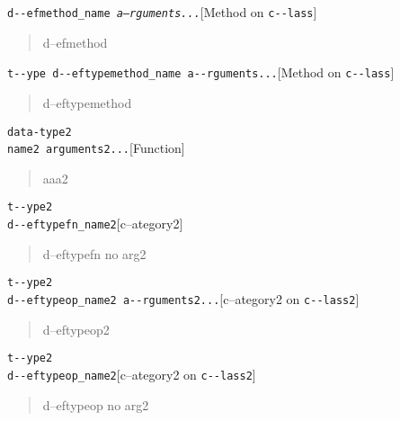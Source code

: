 \documentclass{book}
\begin{document}
\noindent\texttt{d{-}{-}efmethod\_name \EmbracOn{}\textnormal{\textsl{a--rguments...}}\EmbracOff{}}\hfill[Method on \texttt{c{-}{-}lass}]



%
\begin{quote}
d--efmethod
\end{quote}

\noindent\texttt{t{-}{-}ype d{-}{-}eftypemethod\_name a{-}{-}rguments...}\hfill[Method on \texttt{c{-}{-}lass}]



%
\begin{quote}
d--eftypemethod
\end{quote}


\noindent\texttt{data-type2\leavevmode{}\\name2 arguments2...}\hfill[Function]



%
\begin{quote}
aaa2
\end{quote}

\noindent\texttt{t{-}{-}ype2\leavevmode{}\\d{-}{-}eftypefn\_name2}\hfill[c--ategory2]



%
\begin{quote}
d--eftypefn no arg2
\end{quote}

\noindent\texttt{t{-}{-}ype2\leavevmode{}\\d{-}{-}eftypeop\_name2 a{-}{-}rguments2...}\hfill[c--ategory2 on \texttt{c{-}{-}lass2}]



%
\begin{quote}
d--eftypeop2
\end{quote}

\noindent\texttt{t{-}{-}ype2\leavevmode{}\\d{-}{-}eftypeop\_name2}\hfill[c--ategory2 on \texttt{c{-}{-}lass2}]



%
\begin{quote}
d--eftypeop no arg2
\end{quote}
\end{document}

